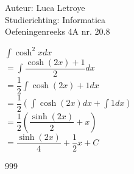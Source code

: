 \documentclass[a4paper]{article}
\begin{document}
  
\noindent \large Auteur: Luca Letroye \\
\noindent \large Studierichting: Informatica\\
\noindent \large Oefeningenreeks 4A nr. 20.8\\

\medskip


\normalsize

$\displaystyle\int \cosh^2x dx$\\

$ = \displaystyle\int \dfrac{\cosh(2x)+1}{2} dx$\\

$ = \dfrac{1}{2} \displaystyle\int \cosh(2x)+1 dx$\\

$ = \dfrac{1}{2}\left(\displaystyle\int\cosh(2x)dx + \displaystyle\int1dx\right)$\\

$ = \dfrac{1}{2}\left(\dfrac{\sinh(2x)}{2}+x\right)$\\

$ = \dfrac{\sinh(2x)}{4} +\dfrac{1}{2}x +C$

\begin{thebibliography}{999}
\end{thebibliography}
\end{document}
